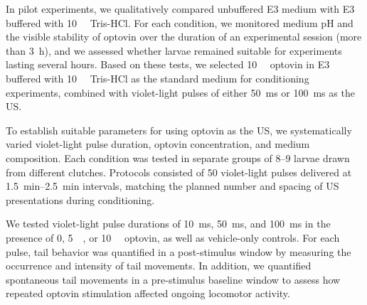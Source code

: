 In pilot experiments, we qualitatively compared unbuffered E3 medium with E3 buffered with \SI{10}{\milli\Molar} Tris-HCl. For each condition, we monitored medium pH and the visible stability of optovin over the duration of an experimental session (more than \SI{3}{\hour}), and we assessed whether larvae remained suitable for experiments lasting several hours. Based on these tests, we selected \SI{10}{\micro\Molar} optovin in E3 buffered with \SI{10}{\milli\Molar} Tris-HCl as the standard medium for conditioning experiments, combined with violet-light pulses of either \SI{50}{\milli\second} or \SI{100}{\milli\second} as the US.


To establish suitable parameters for using optovin as the US, we systematically varied violet-light pulse duration, optovin concentration, and medium composition. Each condition was tested in separate groups of \SIrange{8}{9}{\dpf} larvae drawn from different clutches. Protocols consisted of 50 violet-light pulses delivered at \SIrange{1.5}{2.5}{\minute} intervals, matching the planned number and spacing of US presentations during conditioning.

We tested violet-light pulse durations of \SI{10}{\milli\second}, \SI{50}{\milli\second}, and \SI{100}{\milli\second} in the presence of 0, \SI{5}{\micro\Molar}, or \SI{10}{\micro\Molar} optovin, as well as vehicle-only controls. For each pulse, tail behavior was quantified in a post-stimulus window by measuring the occurrence and intensity of tail movements. In addition, we quantified spontaneous tail movements in a pre-stimulus baseline window to assess how repeated optovin stimulation affected ongoing locomotor activity.


